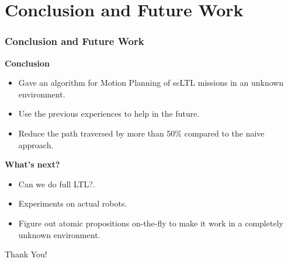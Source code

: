 \documentclass{if-beamer}
\begin{document}
\section{Conclusion and Future Work}

\begin{frame}
	\frametitle{Conclusion and Future Work}
	
	\textbf{Conclusion}
	\begin{itemize}
		\item Gave an algorithm for Motion Planning of scLTL missions in an unknown environment. \pause
		\item Use the previous experiences to help in the future. \pause
		\item Reduce the path traversed by more than 50\% compared to the naive approach.
	\end{itemize}
	\vspace{20pt}

	\textbf{What's next?}
	\begin{itemize}
		\item Can we do full LTL?. \pause
		\item Experiments on actual robots. \pause
		\item Figure out atomic propositions on-the-fly to make it work in a completely unknown environment.
	\end{itemize}
	\vspace{20pt}
	Thank You!
\end{frame}
\end{document}
